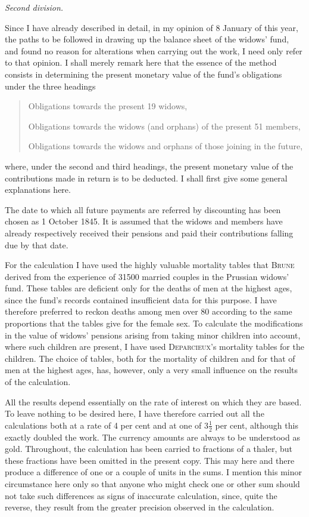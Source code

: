 \begin{center}\textit{Second division.}\end{center}
\noindent\hspace*{\parindent}
Since I have already described in detail, in my opinion of 8 January of this year, the paths to be followed in drawing up the balance sheet of the widows' fund, and found no reason for alterations when carrying out the work, I need only refer to that opinion. I shall merely remark here that the essence of the method consists in determining the present monetary value of the fund's obligations under the three headings
\begin{quote}
Obligations towards the present 19 widows,\par
Obligations towards the widows (and orphans) of the present 51 members,\par
Obligations towards the widows and orphans of those joining in the future,
\end{quote}
\noindent where, under the second and third headings, the present monetary value of the contributions made in return is to be deducted. I shall first give some general explanations here.

The date to which all future payments are referred by discounting has been chosen as 1 October 1845. It is assumed that the widows and members have already respectively received their pensions and paid their contributions falling due by that date.
\par{}
For the calculation I have used the highly valuable mortality tables that \textsc{Brune} derived from the experience of 31500 married couples in the Prussian widows' fund. These tables are deficient only for the deaths of men at the highest ages, since the fund's records contained insufficient data for this purpose. I have therefore preferred to reckon deaths among men over 80 according to the same proportions that the tables give for the female sex. To calculate the modifications in the value of widows' pensions arising from taking minor children into account, where such children are present, I have used \textsc{Deparcieux}'s mortality tables for the children. The choice of tables, both for the mortality of children and for that of men at the highest ages, has, however, only a very small influence on the results of the calculation.

All the results depend essentially on the rate of interest on which they are based. To leave nothing to be desired here, I have therefore carried out all the calculations both at a rate of 4 per cent and at one of \(3\tfrac{1}{2}\) per cent, although this exactly doubled the work. The currency amounts are always to be understood as gold. Throughout, the calculation has been carried to fractions of a thaler, but these fractions have been omitted in the present copy. This may here and there produce a difference of one or a couple of units in the sums. I mention this minor circumstance here only so that anyone who might check one or other sum should not take such differences as signs of inaccurate calculation, since, quite the reverse, they result from the greater precision observed in the calculation.


